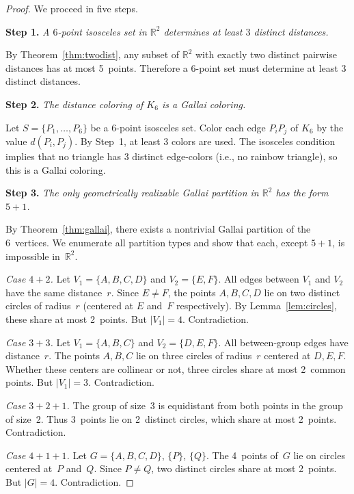 \documentclass[12pt]{amsart}
\theoremstyle{definition}
\begin{document}
\begin{proof}
We proceed in five steps.

\medskip
\noindent\textbf{Step 1.} \emph{A $6$-point isosceles set in\/ $\mathbb{R}^2$ determines at least $3$ distinct distances.}

\smallskip
By Theorem~\ref{thm:twodist}, any subset of $\mathbb{R}^2$ with exactly two distinct pairwise distances has at most 5~points. Therefore a 6-point set must determine at least 3 distinct distances.

\medskip
\noindent\textbf{Step 2.} \emph{The distance coloring of\/ $K_6$ is a Gallai coloring.}

\smallskip
Let $S = \{P_1, \ldots, P_6\}$ be a 6-point isosceles set. Color each edge $P_iP_j$ of $K_6$ by the value $d(P_i, P_j)$. By Step~1, at least 3 colors are used. The isosceles condition implies that no triangle has 3 distinct edge-colors (i.e., no rainbow triangle), so this is a Gallai coloring.

\medskip
\noindent\textbf{Step 3.} \emph{The only geometrically realizable Gallai partition in\/ $\mathbb{R}^2$ has the form $5+1$.}

\smallskip
By Theorem~\ref{thm:gallai}, there exists a nontrivial Gallai partition of the 6~vertices. We enumerate all partition types and show that each, except $5+1$, is impossible in~$\mathbb{R}^2$.

\smallskip
\emph{Case $4+2$.} Let $V_1 = \{A,B,C,D\}$ and $V_2 = \{E,F\}$. All edges between $V_1$ and $V_2$ have the same distance~$r$. Since $E \neq F$, the points $A,B,C,D$ lie on two distinct circles of radius~$r$ (centered at $E$ and~$F$ respectively). By Lemma~\ref{lem:circles}, these share at most 2~points. But $|V_1| = 4$. Contradiction.

\smallskip
\emph{Case $3+3$.} Let $V_1 = \{A,B,C\}$ and $V_2 = \{D,E,F\}$. All between-group edges have distance~$r$. The points $A,B,C$ lie on three circles of radius~$r$ centered at $D,E,F$. Whether these centers are collinear or not, three circles share at most 2~common points. But $|V_1| = 3$. Contradiction.

\smallskip
\emph{Case $3+2+1$.} The group of size~3 is equidistant from both points in the group of size~2. Thus 3~points lie on 2~distinct circles, which share at most 2~points. Contradiction.

\smallskip
\emph{Case $4+1+1$.} Let $G = \{A,B,C,D\}$, $\{P\}$, $\{Q\}$. The 4~points of~$G$ lie on circles centered at~$P$ and~$Q$. Since $P \neq Q$, two distinct circles share at most 2~points. But $|G| = 4$. Contradiction.


\end{proof}
\end{document}
